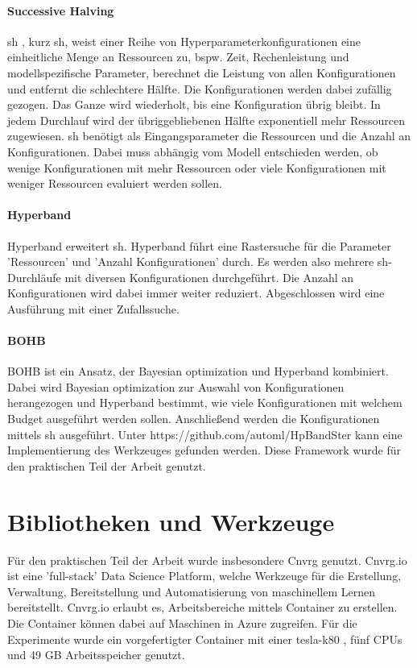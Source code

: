 	\paragraph{Successive Halving}
	\acl{sh} \cite{Jamieson.2015}, kurz \ac{sh}, weist einer Reihe von Hyperparameterkonfigurationen eine einheitliche Menge an Ressourcen zu, bspw. Zeit, Rechenleistung und modellspezifische Parameter, berechnet die Leistung von allen Konfigurationen und entfernt die schlechtere Hälfte. Die Konfigurationen werden dabei zufällig gezogen. Das Ganze wird wiederholt, bis eine Konfiguration übrig bleibt. In jedem Durchlauf wird der übriggebliebenen Hälfte exponentiell mehr Ressourcen zugewiesen. \ac{sh} benötigt als Eingangsparameter die Ressourcen und die Anzahl an Konfigurationen. Dabei muss abhängig vom Modell entschieden werden, ob wenige Konfigurationen mit mehr Ressourcen oder viele Konfigurationen mit weniger Ressourcen evaluiert werden sollen.
			
	\paragraph{Hyperband}	
	Hyperband \cite{Li.2017} erweitert \acl{sh}. Hyperband führt eine Rastersuche für die Parameter 'Ressourcen' und 'Anzahl Konfigurationen' durch. Es werden also mehrere \ac{sh}-Durchläufe mit diversen Konfigurationen durchgeführt. Die Anzahl an Konfigurationen wird dabei immer weiter reduziert. Abgeschlossen wird eine Ausführung mit einer Zufallssuche.
	
	\paragraph{BOHB}
	BOHB \cite{StefanFalkner.2018} ist ein Ansatz, der Bayesian optimization und Hyperband kombiniert. Dabei wird Bayesian optimization zur Auswahl von Konfigurationen herangezogen und Hyperband bestimmt, wie viele Konfigurationen mit welchem Budget ausgeführt werden sollen. Anschließend werden die Konfigurationen mittels \acl{sh} ausgeführt. Unter https://github.com/automl/HpBandSter kann eine Implementierung des Werkzeuges gefunden werden. Diese Framework wurde für den praktischen Teil der Arbeit genutzt.
			
	\section{Bibliotheken und Werkzeuge}
	\label{sec:BibliothekenundWerkzeuge}
	Für den praktischen Teil der Arbeit wurde insbesondere Cnvrg \cite{Kolben.2020} genutzt. Cnvrg.io ist eine 'full-stack' Data Science Platform, welche Werkzeuge für die Erstellung, Verwaltung, Bereitstellung und Automatisierung von maschinellem Lernen bereitstellt. Cnvrg.io erlaubt es, Arbeitsbereiche mittels Container zu erstellen. Die Container können dabei auf Maschinen in Azure \cite{MicrosoftCorporation.2020} zugreifen. Für die Experimente wurde ein vorgefertigter Container mit einer tesla-k80 \cite{Nvidia.2020}, fünf CPUs und 49 GB Arbeitsspeicher genutzt. 

